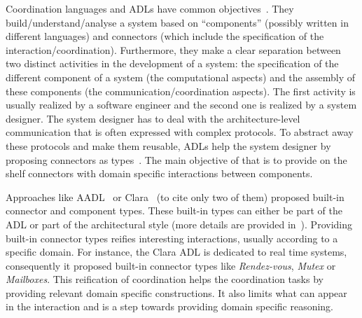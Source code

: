 			
			
Coordination languages and ADLs have common objectives~\cite{coordmodels}. They build/understand/analyse a system based on ``components'' (possibly written in different languages) and connectors (which include the specification of the interaction/coordination). Furthermore, they make a clear separation between two distinct activities in the development of a system: the specification of the different component of a system (\ie the computational aspects) and the assembly of these components (\ie the communication/coordination aspects). The first activity is usually realized by a software engineer and the second one is realized by a system designer. The system designer has to deal with the architecture-level communication that is often expressed with complex protocols. To abstract away these protocols and make them reusable, ADLs help the system designer by proposing connectors as types~\cite{frameadlsbib}. The main objective of that is to provide on the shelf connectors with domain specific interactions between components. 
			
Approaches like AADL~\cite{aadlbib} or Clara~\cite{clarabib} (to cite only two of them) proposed built-in connector and component types. These built-in types can either be part of the ADL or part of the architectural style (more details are provided in~\cite{taxonomyConnectors}). Providing built-in connector types reifies interesting interactions, usually according to a specific domain. For instance, the Clara ADL is dedicated to real time systems, consequently it proposed built-in connector types like \emph{Rendez-vous}, \emph{Mutex} or \emph{Mailboxes}. This reification of coordination helps the coordination tasks by providing relevant domain specific constructions. It also limits what can appear in the interaction and is a step towards providing domain specific reasoning.
			

